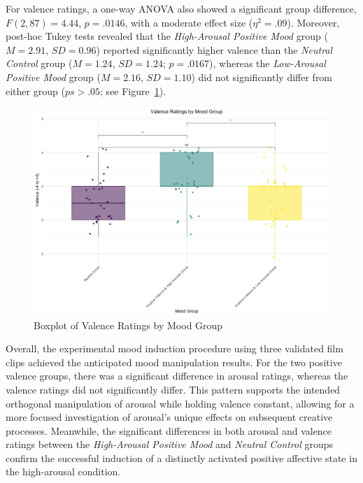 \documentclass[../MA_Thesis.tex]{subfiles}
\begin{document}
For valence ratings, a one-way ANOVA also showed a significant group difference, $F(2, 87) = 4.44$, $p = .0146$, with a moderate effect size ($\eta^2 = .09$). Moreover, post-hoc Tukey tests revealed that the \textit{High-Arousal Positive Mood} group ($M = 2.91$, $SD = 0.96$) reported significantly higher valence than the \textit{Neutral Control} group ($M = 1.24$, $SD = 1.24$; $p = .0167$), whereas the \textit{Low-Arousal Positive Mood} group ($M = 2.16$, $SD = 1.10$) did not significantly differ from either group ($ps > .05$; see Figure~\ref{fig:valence_group}). 

\begin{figure}[H]
  \centering
  \includegraphics[width=\textwidth]{../analysis/results/main_results/mood_induction_check/valence_by_group.png}
  \caption{Boxplot of Valence Ratings by Mood Group}
  \label{fig:valence_group}
\end{figure}

Overall, the experimental mood induction procedure using three validated film clips achieved the anticipated mood manipulation results. For the two positive valence groups, there was a significant difference in arousal ratings, whereas the valence ratings did not significantly differ. This pattern supports the intended orthogonal manipulation of arousal while holding valence constant, allowing for a more focused investigation of arousal's unique effects on subsequent creative processes. Meanwhile, the significant differences in both arousal and valence ratings between the \textit{High-Arousal Positive Mood} and \textit{Neutral Control} groups confirm the successful induction of a distinctly activated positive affective state in the high-arousal condition.
\end{document}

